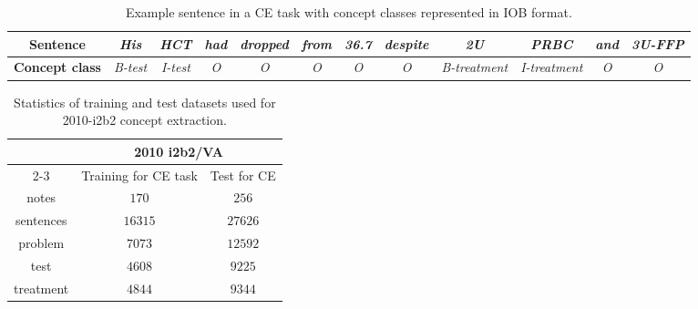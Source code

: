 \documentclass[11pt]{article}
\begin{document}
\begin{table*}[ht]
	\small
	\centering
	
	\begin{tabular}{|c|c|c|c|c|c|c|c|c|c|c|c|}
		\hline \bf Sentence & \textit{His}& \textit{HCT} & \textit{had}& \textit{dropped} & \textit{from} &\textit{36.7} &\textit{despite} &\textit{2U} &\textit{PRBC} &\textit{and} &\textit{3U-FFP} \\ 
		\hline \textbf{Concept class}& \textit{B-test}& \textit{I-test}& \textit{O} & \textit{O}& \textit{O} & \textit{O} & \textit{ O} & \textit{B-treatment} & \textit{I-treatment} & \textit{O} & \textit{O}\\ 			
		\hline
	\end{tabular}
	\caption{Example sentence in a CE task with concept classes represented in IOB format.}
	\label{table1} 
\end{table*}



\begin{table*}[ht]	
	\centering

		\begin{tabular}{|c|c|c|}
			\hline
			\multirow{3}{*}{} & 
			\multicolumn{2}{c|}{\bf {\small 2010 i2b2/VA}} \\  
			\cline{2-3}
		
			& Training for CE task & Test for CE \\		
			\hline
			notes &$170$ &$256$  \\
			sentences &$16315$&$27626$\\ 
			\hline		
			problem  & $7073$   & $12592$  \\		
			test&  $4608$ & $9225$\\		
			treatment& $4844$ & $9344$\\
			 \hline
		\end{tabular}
		\caption{Statistics of training and test datasets used for 2010-i2b2 concept extraction.}
		\label{table2} 
	\end{table*}
\end{document}

